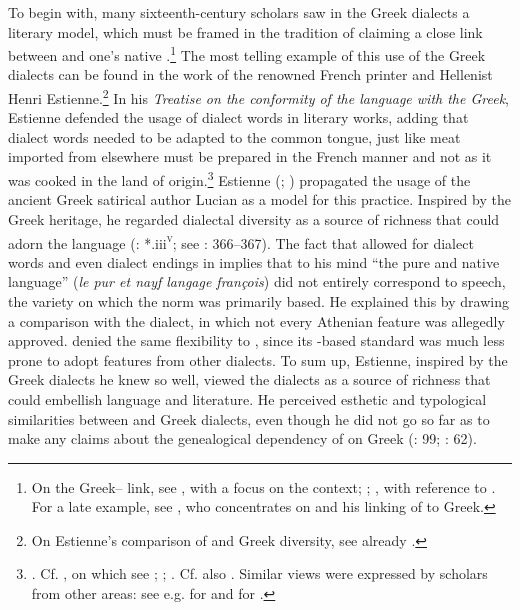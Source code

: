 To begin with, many sixteenth-century scholars saw in the Greek dialects a literary model, which must be framed in the tradition of claiming a close link between  and one’s native .\footnote{On the Greek– link, see \citet{Demaiziere1982}, with a focus on the  context; \citet{Trapp1990}; \citet{Dini2004}, with reference to . For a late example, see \citet[435--436]{VanHal2016}, who concentrates on \citet[119--132]{Reitz1730} and his linking of  to Greek.} The most telling example of this use of the Greek dialects can be found in the work of the renowned French printer and Hellenist Henri Estienne.\footnote{On Estienne’s comparison of  and Greek diversity, see already \citet[70]{Demaiziere1988}.} In his \textit{Treatise on the conformity of the  language with the Greek}, Estienne defended the usage of dialect words in  literary works, adding that dialect words needed to be adapted to the common  tongue, just like meat imported from elsewhere must be prepared in the French manner and not as it was cooked in the land of origin.\footnote{\citet[¶¶.ii\textsc{\textsuperscript{v}}]{Estienne1565}. Cf. \citet[\texttt{\char"2720}\textsc{\textsuperscript{r}}]{Ronsard1550}, on which see \citet[170]{Alinei1984}; \citet[24]{Barbier-mueller1990}; \citet[14]{Trapp1990}. Cf. also \citet[456, 458]{Mambrun1661}. Similar views were expressed by scholars from other areas: see e.g. \citet[\textsc{e.}iii\textsc{\textsuperscript{v}}–\textsc{e.}iv\textsc{\textsuperscript{r}}]{Oreadini1525} for  and \citet[\textsc{a}.vi\textsc{\textsuperscript{r}}]{Craige1606} for .} Estienne (\citeyear[133]{Estienne1579}; \citeyear[*.iii\textsc{\textsuperscript{v}}–*.iiii\textsc{\textsuperscript{r}}]{Estienne1582}) propagated the usage of the ancient Greek satirical author Lucian as a model for this practice. Inspired by the Greek heritage, he regarded  dialectal diversity as a source of richness that could adorn the  language (\citealt{Estienne1582}: *.iii\textsc{\textsuperscript{v}}; see \citealt{Auroux1992}: 366–367). The fact that \citet[143]{Estienne1579} allowed for dialect words and even dialect endings in  implies that to his mind “the pure and native  language” (\textit{le pur et nayf langage françois}) did not entirely correspond to  speech, the variety on which the  norm was primarily based. He explained this by drawing a comparison with the  dialect, in which not every Athenian feature was allegedly approved. \citet[133--134]{Estienne1579} denied the same flexibility to , since its -based standard was much less prone to adopt features from other dialects. To sum up, Estienne, inspired by the Greek dialects he knew so well, viewed the  dialects as a source of richness that could embellish  language and literature. He perceived esthetic and typological similarities between  and Greek dialects, even though he did not go so far as to make any claims about the genealogical dependency of  on Greek (\citealt{Droixhe1978}: 99; \citealt{Considine2008a}: 62).

